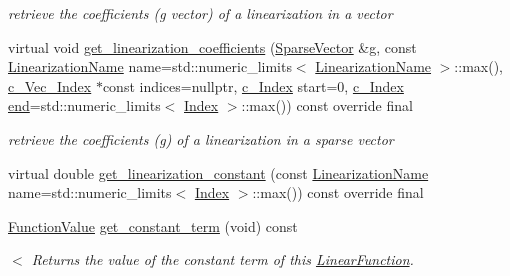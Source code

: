 \begin{Indent}
\begin{DoxyCompactItemize}
\begin{DoxyCompactList}\small\item\em retrieve the coefficients (g vector) of a linearization in a vector \end{DoxyCompactList}\item 
virtual void \mbox{\hyperlink{class_s_m_spp__di__unipi__it_1_1_linear_function_aae9db96155b8cfd53076622b83922cd0}{get\+\_\+linearization\+\_\+coefficients}} (\mbox{\hyperlink{class_s_m_spp__di__unipi__it_1_1_c05_function_a58afb1e1fdc931abd7129be4f92b1f61}{Sparse\+Vector}} \&g, const \mbox{\hyperlink{class_s_m_spp__di__unipi__it_1_1_c05_function_ae90bf93c6d4b4ada66791c735d1c03cc}{Linearization\+Name}} name=std\+::numeric\+\_\+limits$<$ \mbox{\hyperlink{class_s_m_spp__di__unipi__it_1_1_c05_function_ae90bf93c6d4b4ada66791c735d1c03cc}{Linearization\+Name}} $>$\+::max(), \mbox{\hyperlink{group___thin_var_dep_interface___c_l_a_s_s_e_s_ga03461123d4f6090aefeb97ef653d3f2b}{c\+\_\+\+Vec\+\_\+\+Index}} $\ast$const indices=nullptr, \mbox{\hyperlink{group___thin_var_dep_interface___c_l_a_s_s_e_s_gaee6156e2ce80720d57a082d80f39d8cc}{c\+\_\+\+Index}} start=0, \mbox{\hyperlink{group___thin_var_dep_interface___c_l_a_s_s_e_s_gaee6156e2ce80720d57a082d80f39d8cc}{c\+\_\+\+Index}} \mbox{\hyperlink{group___thin_var_dep_interface___c_l_a_s_s_e_s_gae1175d5cbc6627e3e49ed9bcb58ffce9}{end}}=std\+::numeric\+\_\+limits$<$ \mbox{\hyperlink{group___thin_var_dep_interface___c_l_a_s_s_e_s_gad53d6229d7ec28555a9c9c2fd9abf773}{Index}} $>$\+::max()) const override final
\begin{DoxyCompactList}\small\item\em retrieve the coefficients (g) of a linearization in a sparse vector \end{DoxyCompactList}\item 
virtual double \mbox{\hyperlink{class_s_m_spp__di__unipi__it_1_1_linear_function_ad8c41e1b26609250375600fb998b1538}{get\+\_\+linearization\+\_\+constant}} (const \mbox{\hyperlink{class_s_m_spp__di__unipi__it_1_1_c05_function_ae90bf93c6d4b4ada66791c735d1c03cc}{Linearization\+Name}} name=std\+::numeric\+\_\+limits$<$ \mbox{\hyperlink{group___thin_var_dep_interface___c_l_a_s_s_e_s_gad53d6229d7ec28555a9c9c2fd9abf773}{Index}} $>$\+::max()) const override final
\item 
\mbox{\label{class_s_m_spp__di__unipi__it_1_1_linear_function_aa7794d8e3c9b6967a6ae924a07131d0b}} 
\mbox{\hyperlink{class_s_m_spp__di__unipi__it_1_1_function_a9ad432406b609e28d340f73e9474bffe}{Function\+Value}} \mbox{\hyperlink{class_s_m_spp__di__unipi__it_1_1_linear_function_aa7794d8e3c9b6967a6ae924a07131d0b}{get\+\_\+constant\+\_\+term}} (void) const
\begin{DoxyCompactList}\small\item\em $<$ Returns the value of the constant term of this \mbox{\hyperlink{class_s_m_spp__di__unipi__it_1_1_linear_function}{Linear\+Function}}. \end{DoxyCompactList}\end{DoxyCompactItemize}
\end{Indent}
